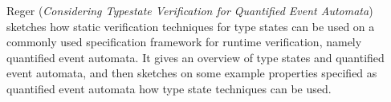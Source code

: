 

Reger
\cite{isola-2016-reger}
({\em Considering Typestate Verification for Quantified 
Event Automata})
sketches how static verification techniques for type states can be used on a commonly used specification framework for runtime verification, namely quantified event automata.
It gives an overview of type states and quantified event automata, and
then sketches on some example properties specified as quantified event
automata how type state techniques can be used.
